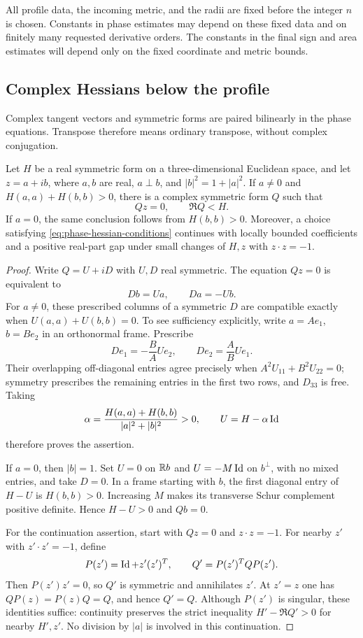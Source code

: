 All profile data, the incoming metric, and the radii are fixed before
the integer $n$ is chosen.  Constants in phase estimates may depend on
these fixed data and on finitely many requested derivative orders.  The
constants in the final sign and area estimates will depend only on the
fixed coordinate and metric bounds.

\subsection{Complex Hessians below the profile}

Complex tangent vectors and symmetric forms are paired bilinearly in
the phase equations.  Transpose therefore means ordinary transpose,
without complex conjugation.

\begin{lemma}
\label{lem:phase-hessian}
Let $H$ be a real symmetric form on a three-dimensional Euclidean
space, and let $z=a+ib$, where $a,b$ are real,
$a\perp b$, and $|b|^2=1+|a|^2$.
If $a\ne0$ and $H(a,a)+H(b,b)>0$, there is a complex symmetric form
$Q$ such that
\begin{equation}
 Qz=0,\qquad \Re Q<H.
 \label{eq:phase-hessian-conditions}
\end{equation}
If $a=0$, the same conclusion follows from $H(b,b)>0$.
Moreover, a choice satisfying \eqref{eq:phase-hessian-conditions}
continues with locally bounded coefficients and a positive real-part
gap under small changes of $H,z$ with $z\cdot z=-1$.
\end{lemma}

\begin{proof}
Write $Q=U+iD$ with $U,D$ real symmetric.  The equation $Qz=0$ is
equivalent to
\[
 Db=Ua,\qquad Da=-Ub.
\]
For $a\ne0$, these prescribed columns of a symmetric $D$ are compatible
exactly when $U(a,a)+U(b,b)=0$.  To see sufficiency explicitly, write
$a=Ae_1$, $b=Be_2$ in an orthonormal frame.  Prescribe
\[
 De_1=-\frac BA Ue_2,\qquad De_2=\frac AB Ue_1.
\]
Their overlapping off-diagonal entries agree precisely when
$A^2U_{11}+B^2U_{22}=0$; symmetry prescribes the remaining entries in
the first two rows, and $D_{33}$ is free.  Taking
\[
 \alpha=\frac{H(a,a)+H(b,b)}{|a|^2+|b|^2}>0,
 \qquad U=H-\alpha\operatorname{Id}
\]
therefore proves the assertion.

If $a=0$, then $|b|=1$.  Set $U=0$ on $\mathbb R b$ and
$U=-M\operatorname{Id}$ on $b^\perp$, with no mixed entries, and take $D=0$.
In a frame starting with $b$, the first diagonal entry of $H-U$ is
$H(b,b)>0$.  Increasing $M$ makes its transverse Schur complement
positive definite.  Hence $H-U>0$ and $Qb=0$.

For the continuation assertion, start with $Qz=0$ and $z\cdot z=-1$.
For nearby $z'$ with $z'\cdot z'=-1$, define
\[
 P(z')=\operatorname{Id}+z'(z')^T,
 \qquad Q'=P(z')^TQP(z').
\]
Then $P(z')z'=0$, so $Q'$ is symmetric and annihilates $z'$.
At $z'=z$ one has $QP(z)=P(z)Q=Q$, and hence $Q'=Q$.
Although $P(z')$ is singular, these identities suffice: continuity
preserves the strict inequality $H'-\Re Q'>0$ for nearby $H',z'$.
No division by $|a|$ is involved in this continuation.
\end{proof}

